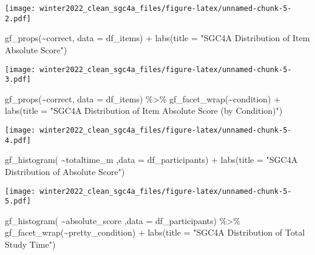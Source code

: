 \documentclass[
]{article}
\newenvironment{Shaded}{\begin{snugshade}}{\end{snugshade}}
\newcommand{\AttributeTok}[1]{\textcolor[rgb]{0.77,0.63,0.00}{#1}}
\newcommand{\FunctionTok}[1]{\textcolor[rgb]{0.00,0.00,0.00}{#1}}
\newcommand{\NormalTok}[1]{#1}
\newcommand{\SpecialCharTok}[1]{\textcolor[rgb]{0.00,0.00,0.00}{#1}}
\newcommand{\StringTok}[1]{\textcolor[rgb]{0.31,0.60,0.02}{#1}}
\begin{document}
\texttt{[image: winter2022\_clean\_sgc4a\_files/figure-latex/unnamed-chunk-5-2.pdf]}

\begin{Shaded}
\begin{Highlighting}[]
\FunctionTok{gf\_props}\NormalTok{(}\SpecialCharTok{\textasciitilde{}}\NormalTok{correct, }\AttributeTok{data =}\NormalTok{ df\_items) }\SpecialCharTok{+} 
  \FunctionTok{labs}\NormalTok{(}\AttributeTok{title =} \StringTok{"SGC4A Distribution of Item Absolute Score"}\NormalTok{)}
\end{Highlighting}
\end{Shaded}

\texttt{[image: winter2022\_clean\_sgc4a\_files/figure-latex/unnamed-chunk-5-3.pdf]}

\begin{Shaded}
\begin{Highlighting}[]
\FunctionTok{gf\_props}\NormalTok{(}\SpecialCharTok{\textasciitilde{}}\NormalTok{correct, }\AttributeTok{data =}\NormalTok{ df\_items) }\SpecialCharTok{\%\textgreater{}\%} 
  \FunctionTok{gf\_facet\_wrap}\NormalTok{(}\SpecialCharTok{\textasciitilde{}}\NormalTok{condition) }\SpecialCharTok{+} 
  \FunctionTok{labs}\NormalTok{(}\AttributeTok{title =} \StringTok{"SGC4A Distribution of Item Absolute Score (by Condition)"}\NormalTok{)}
\end{Highlighting}
\end{Shaded}

\texttt{[image: winter2022\_clean\_sgc4a\_files/figure-latex/unnamed-chunk-5-4.pdf]}

\begin{Shaded}
\begin{Highlighting}[]
\FunctionTok{gf\_histogram}\NormalTok{( }\SpecialCharTok{\textasciitilde{}}\NormalTok{totaltime\_m ,}\AttributeTok{data =}\NormalTok{ df\_participants) }\SpecialCharTok{+} 
  \FunctionTok{labs}\NormalTok{(}\AttributeTok{title =} \StringTok{"SGC4A Distribution of Absolute Score"}\NormalTok{)}
\end{Highlighting}
\end{Shaded}

\texttt{[image: winter2022\_clean\_sgc4a\_files/figure-latex/unnamed-chunk-5-5.pdf]}

\begin{Shaded}
\begin{Highlighting}[]
\FunctionTok{gf\_histogram}\NormalTok{( }\SpecialCharTok{\textasciitilde{}}\NormalTok{absolute\_score ,}\AttributeTok{data =}\NormalTok{ df\_participants) }\SpecialCharTok{\%\textgreater{}\%} 
  \FunctionTok{gf\_facet\_wrap}\NormalTok{(}\SpecialCharTok{\textasciitilde{}}\NormalTok{pretty\_condition) }\SpecialCharTok{+}
  \FunctionTok{labs}\NormalTok{(}\AttributeTok{title =} \StringTok{"SGC4A Distribution of Total Study Time"}\NormalTok{)}
\end{Highlighting}
\end{Shaded}
\end{document}
